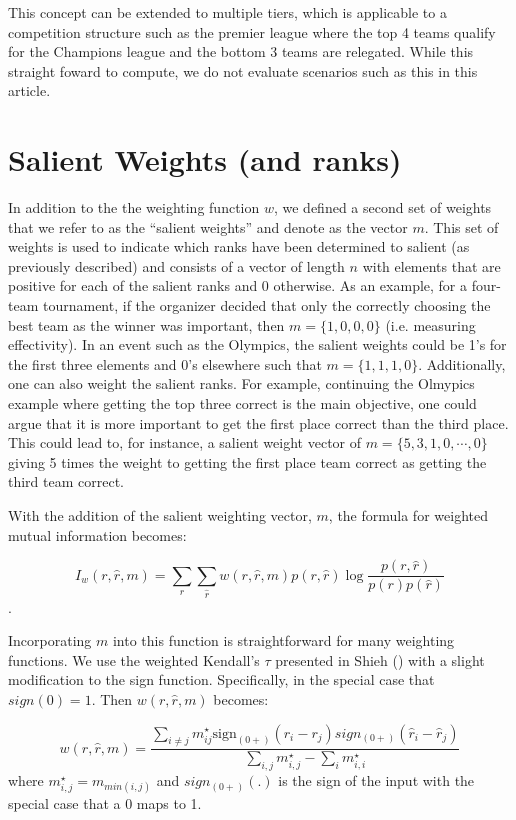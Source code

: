 \documentclass[
  12pt,
]{article}
\begin{document}
This concept can be extended to multiple tiers, which is applicable to a
competition structure such as the premier league where the top 4 teams
qualify for the Champions league and the bottom 3 teams are relegated.
While this straight foward to compute, we do not evaluate scenarios such
as this in this article.

\section{Salient Weights (and ranks)}\label{salient-weights-and-ranks}

In addition to the the weighting function \(w\), we defined a second set
of weights that we refer to as the ``salient weights'' and denote as the
vector \(m\). This set of weights is used to indicate which ranks have
been determined to salient (as previously described) and consists of a
vector of length \(n\) with elements that are positive for each of the
salient ranks and 0 otherwise. As an example, for a four-team
tournament, if the organizer decided that only the correctly choosing
the best team as the winner was important, then \(m = \{1,0,0,0\}\)
(i.e. measuring effectivity). In an event such as the Olympics, the
salient weights could be 1's for the first three elements and 0's
elsewhere such that \(m = \{1,1,1,0\}\). Additionally, one can also
weight the salient ranks. For example, continuing the Olmypics example
where getting the top three correct is the main objective, one could
argue that it is more important to get the first place correct than the
third place. This could lead to, for instance, a salient weight vector
of \(m = \{5,3,1,0, \cdots, 0\}\) giving 5 times the weight to getting
the first place team correct as getting the third team correct.

With the addition of the salient weighting vector, \(m\), the formula
for weighted mutual information becomes:

\[
I_w(r,\hat{r},m)= \sum_{r}\sum_{\hat{r}}w(r, \hat{r}, m)p(r,\hat{r})\log \frac {p(r,\hat{r})}{p(r)p(\hat{r})}
\] .

Incorporating \(m\) into this function is straightforward for many
weighting functions. We use the weighted Kendall's \(\tau\) presented in
Shieh () with a slight modification to the
sign function. Specifically, in the special case that \(sign(0) = 1\).
Then \(w(r, \hat{r}, m)\) becomes:

\[
w(r, \hat{r}, m) = \frac{\sum_{i \ne j} m^{\star}_{ij}\text{sign}_{(0+)}(r_i - r_j)sign_{(0+)}(\hat{r}_i - \hat{r}_j)}{\sum_{i,j}m^{\star}_{i,j}- \sum_i m^{\star}_{i,i}}
\] where \(m^{\star}_{i,j} = m_{min(i,j)}\) and \(sign_{(0+)}(.)\) is
the sign of the input with the special case that a 0 maps to 1.
\end{document}
